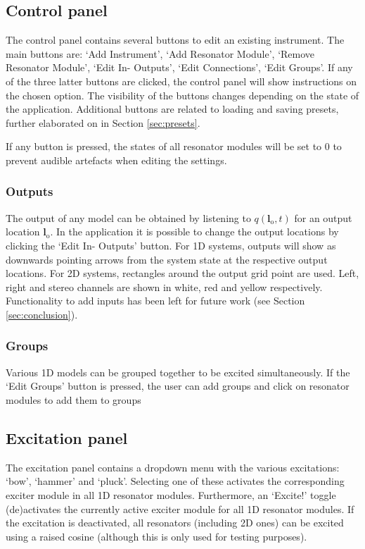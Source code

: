 \documentclass{article}
\begin{document}
\subsection{Control panel}\label{sec:controlPanel}
The control panel contains several buttons to edit an existing instrument. The main buttons are: `Add Instrument', `Add Resonator Module', `Remove Resonator Module', `Edit In- Outputs', `Edit Connections', `Edit Groups'. If any of the three latter buttons are clicked, the control panel will show instructions on the chosen option. The visibility of the buttons changes depending on the state of the application. Additional buttons are related to loading and saving presets, further elaborated on in Section \ref{sec:presets}.

If any button is pressed, the states of all resonator modules will be set to 0 to prevent audible artefacts when editing the settings. 

\subsubsection{Outputs}

The output of any model can be obtained by listening to $q(\boldsymbol{l}_\text{o}, t)$ for an output location $\boldsymbol{l}_\text{o}$. In the application it is possible to change the output locations by clicking the `Edit In- Outputs' button. For 1D systems, outputs will show as downwards pointing arrows from the system state at the respective output locations. For 2D systems, rectangles around the output grid point are used. Left, right and stereo channels are shown in white, red and yellow respectively. Functionality to add inputs has been left for future work (see Section \ref{sec:conclusion}).

\subsubsection{Groups}
Various 1D models can be grouped together to be excited simultaneously. If the `Edit Groups' button is pressed, the user can add groups and click on resonator modules to add them to groups 


\subsection{Excitation panel}\label{sec:excitationPanel}
The excitation panel contains a dropdown menu with the various excitations: `bow', `hammer' and `pluck'. Selecting one of these activates the corresponding exciter module in all 1D resonator modules. Furthermore, an `Excite!' toggle (de)activates the currently active exciter module for all 1D resonator modules. If the excitation is deactivated, all resonators (including 2D ones) can be excited using a raised cosine (although this is only used for testing purposes).
\end{document}
